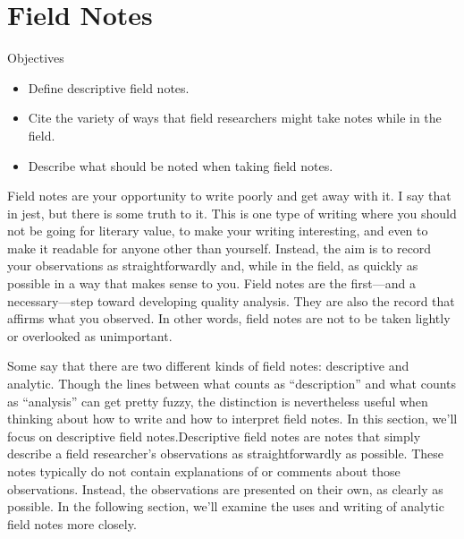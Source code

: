 \section{Field Notes}

\begin{center}
	\begin{objbox}{Objectives}
		\begin{itemize}
			\setlength{\itemsep}{0pt}
			\setlength{\parskip}{0pt}
			\setlength{\parsep}{0pt}
			
			\item Define descriptive field notes.
			\item Cite the variety of ways that field researchers might take notes while in the field.
			\item Describe what should be noted when taking field notes.
			
		\end{itemize}
	\end{objbox}
\end{center}

Field notes are your opportunity to write poorly and get away with it. I say that in jest, but there is some truth to it. This is one type of writing where you should not be going for literary value, to make your writing interesting, and even to make it readable for anyone other than yourself. Instead, the aim is to record your observations as straightforwardly and, while in the field, as quickly as possible in a way that makes sense to you. Field notes are the first—and a necessary—step toward developing quality analysis. They are also the record that affirms what you observed. In other words, field notes are not to be taken lightly or overlooked as unimportant.

Some say that there are two different kinds of field notes: descriptive and analytic. Though the lines between what counts as “description” and what counts as “analysis” can get pretty fuzzy, the distinction is nevertheless useful when thinking about how to write and how to interpret field notes. In this section, we’ll focus on descriptive field notes.Descriptive field notes are notes that simply describe a field researcher’s observations as straightforwardly as possible. These notes typically do not contain explanations of or comments about those observations. Instead, the observations are presented on their own, as clearly as possible. In the following section, we’ll examine the uses and writing of analytic field notes more closely.

